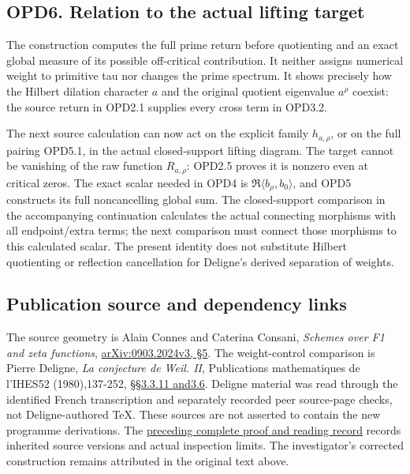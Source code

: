 \subsection{OPD6. Relation to the actual lifting
target}\label{opd6.-relation-to-the-actual-lifting-target}

The construction computes the full prime return before quotienting and
an exact global measure of its possible off-critical contribution. It
neither assigns numerical weight to primitive tau nor changes the prime
spectrum. It shows precisely how the Hilbert dilation character \(a\)
and the original quotient eigenvalue \(a^\rho\) coexist: the source
return in OPD2.1 supplies every cross term in OPD3.2.

The next source calculation can now act on the explicit family
\(h_{a,\rho}\), or on the full pairing OPD5.1, in the actual
closed-support lifting diagram. The target cannot be vanishing of the
raw function \(R_{a,\rho}\): OPD2.5 proves it is nonzero even at
critical zeros. The exact scalar needed in OPD4 is
\(\Re\langle b_\rho,b_0\rangle\), and OPD5 constructs its full
noncancelling global sum. The closed-support comparison in the
accompanying continuation calculates the actual connecting morphisms
with all endpoint/extra terms; the next comparison must connect those
morphisms to this calculated scalar. The present identity does not
substitute Hilbert quotienting or reflection cancellation for Deligne's
derived separation of weights.

\subsection{Publication source and dependency
links}\label{publication-source-and-dependency-links}

The source geometry is Alain Connes and Caterina Consani, \emph{Schemes
over F1 and zeta functions},
\href{https://arxiv.org/abs/0903.2024v3}{arXiv:0903.2024v3, §5}. The
weight-control comparison is Pierre Deligne, \emph{La conjecture de
Weil. II}, Publications mathematiques de l'IHES52 (1980),137-252,
\href{https://www.numdam.org/item/PMIHES_1980__52__137_0/}{§§3.3.11
and3.6}. Deligne material was read through the identified French
transcription and separately recorded peer source-page checks, not
Deligne-authored TeX. These sources are not asserted to contain the new
programme derivations. The
\href{https://github.com/KokunoYumeto/zeta-function-research-reader/blob/36a82ecca98addb8a98b48204e349737856c7223/workbenches/splitzero-tandem/continuations/20260924-cohomology-weight-and-character-lifts/BUILD_AND_REVIEW.md}{preceding
complete proof and reading record} records inherited source versions and
actual inspection limits. The investigator's corrected construction
remains attributed in the original text above.
